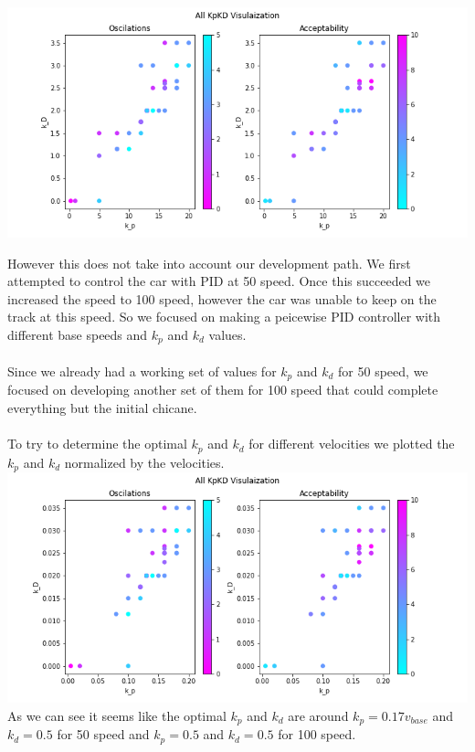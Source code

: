 \documentclass[12pt]{article}
\begin{document}
\begin{multicols}{2}
\begin{center}
\centering
\includegraphics*[scale=0.3]{KpKiAll.png}
\end{center}
However this does not take into account our development path. 
We first attempted to control the car with PID at 50 speed. Once this succeeded we increased the speed to 
100 speed, however the car was unable to keep on the track at this speed. So we focused on making a peicewise PID controller with different base speeds and 
$k_p$ and $k_d$ values.\\\\
 Since we already had a working set of values for $k_p$ and $k_d$ for 50 speed, we focused on developing another set of
them for 100 speed that could complete everything but the initial chicane.
\\\\
To try to determine the optimal $k_p$ and $k_d$ for different velocities we 
plotted the $k_p$ and $k_d$ normalized by the velocities.\\
\includegraphics*[scale=0.3]{KpKiAllNormalized.png}\\
As we can see it seems like the optimal $k_p$ and $k_d$ are around $k_p=0.17v_{base}$ and $k_d=0.5$ for 50 speed and $k_p=0.5$ and $k_d=0.5$ for 100 speed.


\end{multicols}
\end{document}
